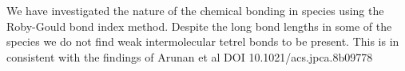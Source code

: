 \documentclass[journal=jpcafh,manuscript=letter]{achemso}
\begin{document}
We have investigated the nature of the chemical bonding 
in  species using the Roby-Gould bond index method.
Despite the long bond lengths in some of the species
we do not find weak intermolecular tetrel bonds to be present. This is in consistent with the findings of Arunan et al DOI 10.1021/acs.jpca.8b09778
\end{document}

